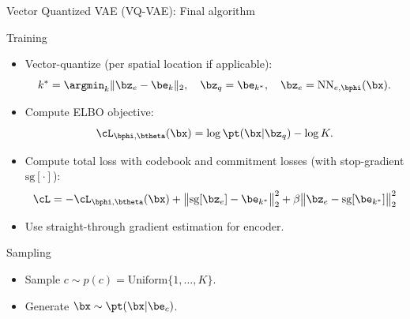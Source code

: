 \documentclass{beamer}
\begin{document}
\begin{frame}{Vector Quantized VAE (VQ-VAE): Final algorithm}
	\begin{block}{Training}
		\begin{itemize}
			\item Vector-quantize (per spatial location if applicable):
			\vspace{-0.3cm}
			\[
				k^* = \argmin_k \|\bz_e - \be_k\|_2, \quad \bz_q = \be_{k^*}, \quad \bz_e = \text{NN}_{e,\bphi}(\bx).
			\]
			\vspace{-0.5cm}
			\item Compute ELBO objective:
			\vspace{-0.3cm}
			\[
				\cL_{\bphi, \btheta}(\bx) = \log \pt(\bx | \bz_q) - \log K.
			\]
			\vspace{-0.5cm}
			\item Compute total loss with codebook and commitment losses (with stop-gradient $\text{sg}[\cdot]$):
			\vspace{-0.3cm}
			\[
				\cL = - \cL_{\bphi, \btheta}(\bx) + \big\|\text{sg}[\bz_e] - \be_{k^*}\big\|_2^2 + \beta \big\|\bz_e - \text{sg}[\be_{k^*}]\big\|_2^2
			\]
			\vspace{-0.5cm}
			\item Use straight-through gradient estimation for encoder.
		\end{itemize}
	\end{block}
	\eqpause
	\vspace{-0.3cm}
	\begin{block}{Sampling}
		\begin{itemize}
			\item Sample $c \sim p(c) = \text{Uniform}\{1, \dots, K\}$.
			\item Generate $\bx \sim \pt(\bx | \be_c)$.
		\end{itemize}
	\end{block}
\end{frame}
\end{document}
